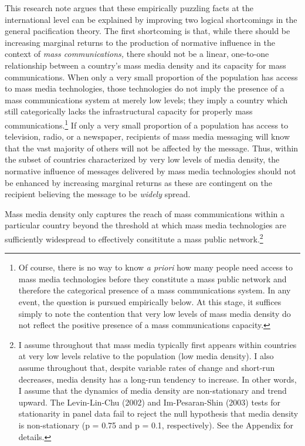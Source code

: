 \documentclass[11pt,article,oneside]{memoir}
\begin{document}
This research note argues that these empirically puzzling facts at the
international level can be explained by improving two logical
shortcomings in the general pacification theory. The first shortcoming
is that, while there should be increasing marginal returns to the
production of normative influence in the context of \emph{mass
communications,} there should not be a linear, one-to-one relationship
between a country's mass media density and its capacity for mass
communications. When only a very small proportion of the population has
access to mass media technologies, those technologies do not imply the
presence of a mass communications system at merely low levels; they
imply a country which still categorically lacks the infrastructural
capacity for properly mass communications.\footnote{Of course, there is
  no way to know \emph{a priori} how many people need access to mass
  media technologies before they constitute a mass public network and
  therefore the categorical presence of a mass communications system. In
  any event, the question is pursued empirically below. At this stage,
  it suffices simply to note the contention that very low levels of mass
  media density do not reflect the positive presence of a mass
  communications capacity.} If only a very small proportion of a
population has access to television, radio, or a newspaper, recipients
of mass media messaging will know that the vast majority of others will
not be affected by the message. Thus, within the subset of countries
characterized by very low levels of media density, the normative
influence of messages delivered by mass media technologies should not be
enhanced by increasing marginal returns as these are contingent on the
recipient believing the message to be \emph{widely} spread.

Mass media density only captures the reach of mass communications within
a particular country beyond the threshold at which mass media
technologies are sufficiently widespread to effectively consititute a
mass public network.\footnote{I assume throughout that mass media
  typically first appears within countries at very low levels relative
  to the population (low media density). I also assume throughout that,
  despite variable rates of change and short-run decreases, media
  density has a long-run tendency to increase. In other words, I assume
  that the dynamics of media density are non-stationary and trend
  upward. The Levin-Lin-Chu (2002) and Im-Pesaran-Shin (2003) tests for
  stationarity in panel data fail to reject the null hypothesis that
  media density is non-stationary (p = 0.75 and p = 0.1, respectively).
  See the Appendix for details.}
\end{document}
